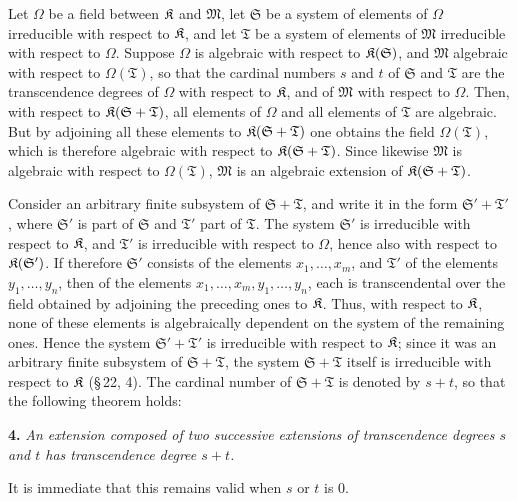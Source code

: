 Let \(\Omega\) be a field between \(\mathfrak K\) and \(\mathfrak M\), let \(\mathfrak S\) be a system of elements of \(\Omega\) irreducible with respect to \(\mathfrak K\), and let \(\mathfrak T\) be a system of elements of \(\mathfrak M\) irreducible with respect to \(\Omega\). Suppose \(\Omega\) is algebraic with respect to \(\mathfrak K(\mathfrak S)\), and \(\mathfrak M\) algebraic with respect to \(\Omega(\mathfrak T)\), so that the cardinal numbers \(s\) and \(t\) of \(\mathfrak S\) and \(\mathfrak T\) are the transcendence degrees of \(\Omega\) with respect to \(\mathfrak K\), and of \(\mathfrak M\) with respect to \(\Omega\). Then, with respect to \(\mathfrak K(\mathfrak S+\mathfrak T)\), all elements of \(\Omega\) and all elements of \(\mathfrak T\) are algebraic. But by adjoining all these elements to \(\mathfrak K(\mathfrak S+\mathfrak T)\) one obtains the field \(\Omega(\mathfrak T)\), which is therefore algebraic with respect to \(\mathfrak K(\mathfrak S+\mathfrak T)\). Since likewise \(\mathfrak M\) is algebraic with respect to \(\Omega(\mathfrak T)\), \(\mathfrak M\) is an algebraic extension of \(\mathfrak K(\mathfrak S+\mathfrak T)\).

Consider an arbitrary finite subsystem of \(\mathfrak S+\mathfrak T\), and write it in the form \(\mathfrak S'+\mathfrak T'\), where \(\mathfrak S'\) is part of \(\mathfrak S\) and \(\mathfrak T'\) part of \(\mathfrak T\). The system \(\mathfrak S'\) is irreducible with respect to \(\mathfrak K\), and \(\mathfrak T'\) is irreducible with respect to \(\Omega\), hence also with respect to \(\mathfrak K(\mathfrak S')\). If therefore \(\mathfrak S'\) consists of the elements \(x_1,\ldots,x_m\), and \(\mathfrak T'\) of the elements \(y_1,\ldots,y_n\), then of the elements \(x_1,\ldots,x_m,y_1,\ldots,y_n\), each is transcendental over the field obtained by adjoining the preceding ones to \(\mathfrak K\). Thus, with respect to \(\mathfrak K\), none of these elements is algebraically dependent on the system of the remaining ones. Hence the system \(\mathfrak S'+\mathfrak T'\) is irreducible with respect to \(\mathfrak K\); since it was an arbitrary finite subsystem of \(\mathfrak S+\mathfrak T\), the system \(\mathfrak S+\mathfrak T\) itself is irreducible with respect to \(\mathfrak K\) (\S\,22, 4). The cardinal number of \(\mathfrak S+\mathfrak T\) is denoted by \(s+t\), so that the following theorem holds:

\textbf{4.} \emph{An extension composed of two successive extensions of transcendence degrees \(s\) and \(t\) has transcendence degree \(s+t\).}

It is immediate that this remains valid when \(s\) or \(t\) is 0.

